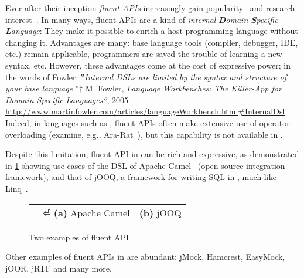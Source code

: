 Ever after their inception \emph{fluent APIs}
  increasingly gain popularity~\cite{Bauer:2005,Freeman:Pryce:06,Larsen:2012} and research
  interest~\cite{Deursen:2000,Kabanov:2008}.
In many ways, fluent APIs are a kind of
  \emph{internal} \emph{\textbf Domain \textbf Specific \textbf Language}:
They make it possible to enrich a host programming language without changing it.
Advantages are many: base language tools (compiler, debugger, IDE, etc.) remain
  applicable, programmers are saved the trouble of learning a new syntax, etc.
However, these advantages come at the cost of expressive power;
  in the words of Fowler:
  ‟\emph{Internal DSLs are limited by the syntax and structure of your base language.}”†
  {M. Fowler, \emph{Language Workbenches: The Killer-App for Domain Specific Languages?}, 
    2005
    \newline
  \url{http://www.martinfowler.com/articles/languageWorkbench.html\#InternalDsl}}.
Indeed, in languages such as \CC, fluent APIs
  often make extensive use of operator overloading (examine, e.g., \textsf{Ara-Rat}~\cite{Gil:Lenz:07}),
  but this capability is not available in \Java.

Despite this limitation, fluent API in \Java can be rich and expressive, as demonstrated
  in \cref{Figure:DSL} showing use cases of the DSL of Apache Camel~\cite{Ibsen:Anstey:10}
(open-source integration framework),
and that of jOOQ, a framework for writing
  SQL in \Java, much like Linq~\cite{Meijer:Beckman:Bierman:06}.

\begin{figure}[H]
  \caption{\label{Figure:DSL} Two examples of \Java fluent API}
  \begin{tabular}{@{}c@{}c@{}}
    \parbox[c]{44ex}{} &
    \hspace{-3ex} \parbox[c]{59ex}{} ⏎
    \textbf{(a)} Apache Camel                                          & \textbf{(b)} jOOQ
  \end{tabular}
\end{figure}

Other examples of fluent APIs in \Java are abundant: 
  jMock\cite{Freeman:Pryce:06}, 
  Hamcrest,
  EasyMock,
  jOOR,
  jRTF
  and many more.

